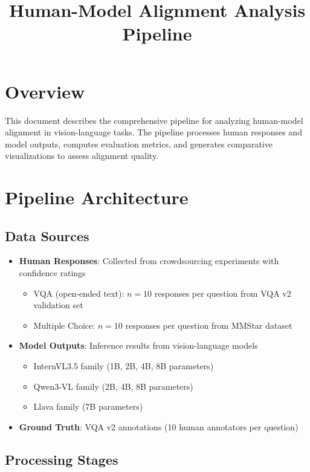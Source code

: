 \documentclass{article}
\title{Human-Model Alignment Analysis Pipeline}
\author{}
\date{}
\begin{document}
\maketitle

\section{Overview}

This document describes the comprehensive pipeline for analyzing human-model alignment in vision-language tasks. The pipeline processes human responses and model outputs, computes evaluation metrics, and generates comparative visualizations to assess alignment quality.

\section{Pipeline Architecture}

\subsection{Data Sources}

\begin{itemize}
    \item \textbf{Human Responses}: Collected from crowdsourcing experiments with confidence ratings
    \begin{itemize}
        \item VQA (open-ended text): $n=10$ responses per question from VQA v2 validation set
        \item Multiple Choice: $n=10$ responses per question from MMStar dataset
    \end{itemize}
    \item \textbf{Model Outputs}: Inference results from vision-language models
    \begin{itemize}
        \item InternVL3.5 family (1B, 2B, 4B, 8B parameters)
        \item Qwen3-VL family (2B, 4B, 8B parameters)
        \item Llava family (7B parameters)
    \end{itemize}
    \item \textbf{Ground Truth}: VQA v2 annotations (10 human annotators per question)
\end{itemize}

\subsection{Processing Stages}
\end{document}
